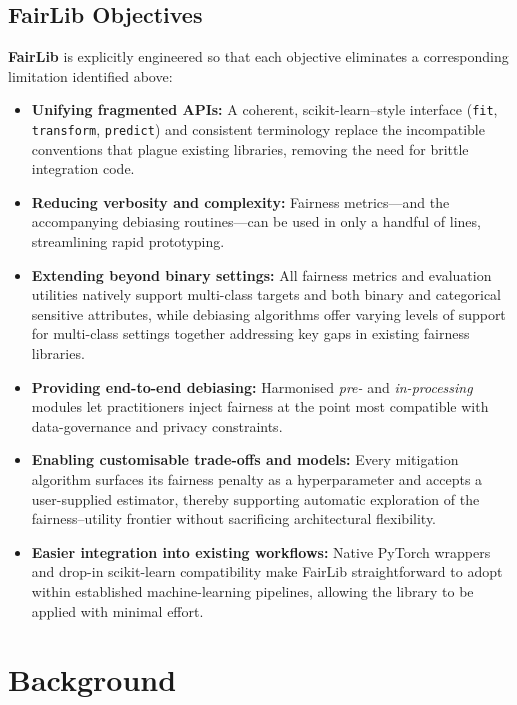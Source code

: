 \documentclass[12pt,a4paper,openright,twoside]{book}
\begin{document}
\section{FairLib Objectives}
\textbf{FairLib} is explicitly engineered so that each objective eliminates a
corresponding limitation identified above:

\begin{itemize}
  \item \textbf{Unifying fragmented APIs:}  
  A coherent, scikit-learn–style interface
  (\texttt{fit}, \texttt{transform}, \texttt{predict}) and consistent terminology
  replace the incompatible conventions that plague existing libraries,
  removing the need for brittle integration code.

  \item \textbf{Reducing verbosity and complexity:}  
  Fairness metrics—and the accompanying debiasing routines—can be used in only a handful of lines, streamlining rapid prototyping.

  \item \textbf{Extending beyond binary settings:}  
  All fairness metrics and evaluation utilities natively support multi-class targets and both binary and categorical sensitive attributes, while debiasing algorithms offer varying levels of support for multi-class settings together addressing key gaps in existing fairness libraries.

  \item \textbf{Providing end-to-end debiasing:}  
  Harmonised \emph{pre-} and \emph{in-processing} modules let practitioners inject fairness at the point most compatible with data-governance and privacy constraints.

  \item \textbf{Enabling customisable trade-offs and models:}  
  Every mitigation algorithm surfaces its fairness penalty as a hyperparameter and accepts a user-supplied estimator, thereby supporting automatic exploration of the fairness–utility frontier without sacrificing architectural flexibility.

  \item \textbf{Easier integration into existing workflows:} Native PyTorch wrappers and drop-in scikit-learn compatibility make FairLib straightforward to adopt within established machine-learning pipelines, allowing the library to be applied with minimal effort.
\end{itemize}



\chapter{Background}
\end{document}
